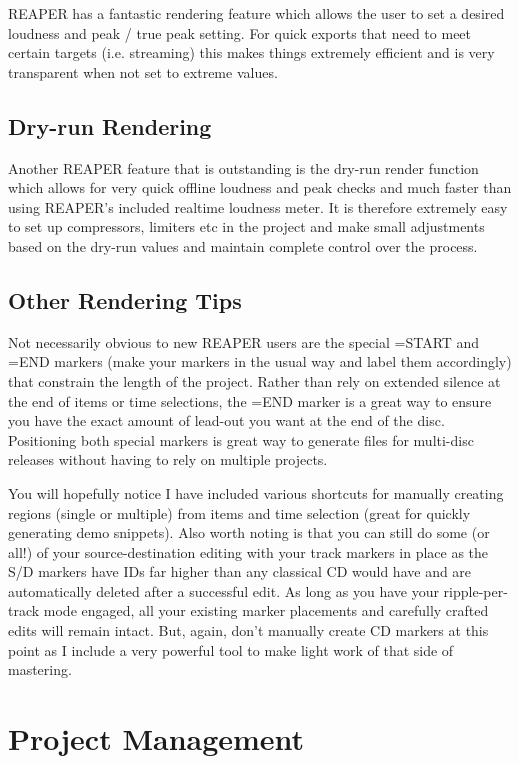 \documentclass[10pt,american]{article}
\begin{document}
REAPER has a fantastic rendering feature which allows the user to set a desired
loudness and peak / true peak setting. For quick exports that need to meet
certain targets (i.e. streaming) this makes things extremely efficient and is
very transparent when not set to extreme values.

\subsection{Dry-run Rendering}

Another REAPER feature that is outstanding is the dry-run render function which
allows for very quick offline loudness and peak checks and much faster than
using REAPER's included realtime loudness meter. It is therefore extremely easy
to set up compressors, limiters etc in the project and make small adjustments
based on the dry-run values and maintain complete control over the process. 

\subsection{Other Rendering Tips}

Not necessarily obvious to new REAPER users are the special =START and =END
markers (make your markers in the usual way and label them accordingly) that
constrain the length of the project. Rather than rely on extended silence at the
end of items or time selections, the =END marker is a great way to ensure you
have the exact amount of lead-out you want at the end of the disc. Positioning
both special markers is great way to generate files for multi-disc releases
without having to rely on multiple projects.

You will hopefully notice I have included various shortcuts for manually
creating regions (single or multiple) from items and time selection (great for
quickly generating demo snippets). Also worth noting is that you can still do
some (or all!) of your source-destination editing with your track markers in
place as the S/D markers have IDs far higher than any classical CD would have
and are automatically deleted after a successful edit. As long as you have your
ripple-per-track mode engaged, all your existing marker placements and carefully
crafted edits will remain intact. But, again, don't manually create CD markers
at this point as I include a very powerful tool to make light work of that side
of mastering.

\section{Project Management}
\end{document}
